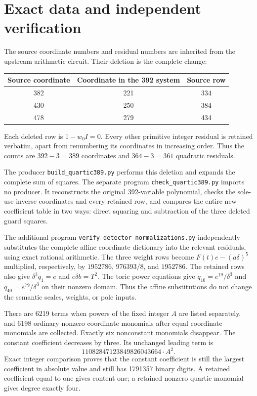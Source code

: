 \documentclass[11pt,a4paper]{article}
\theoremstyle{remark}\newtheorem{remark}[theorem]{Remark}
\begin{document}
\section{Exact data and independent verification}
The source coordinate numbers and residual numbers are inherited from
the upstream arithmetic circuit. Their deletion is the complete change:
\begin{center}
\begin{tabular}{ccc}
\toprule Source coordinate & Coordinate in the 392 system & Source row\\
\midrule382&221&334\\430&250&384\\478&279&434\\\bottomrule
\end{tabular}
\end{center}
Each deleted row is $1-w_0I=0$. Every other primitive integer residual
is retained verbatim, apart from renumbering its coordinates in increasing
order. Thus the counts are $392-3=389$ coordinates and $364-3=361$
quadratic residuals.

The producer \nolinkurl{build_quartic389.py} performs this deletion
and expands the complete sum of squares. The separate program
\nolinkurl{check_quartic389.py} imports no producer. It reconstructs
the original 392-variable polynomial, checks the sole-use inverse
coordinates and every retained row, and compares the entire new
coefficient table in two ways: direct squaring and subtraction of
the three deleted guard squares.

The additional program \nolinkurl{verify_detector_normalizations.py}
independently substitutes the complete affine coordinate dictionary
into the relevant residuals, using exact rational arithmetic. The
three weight rows become $F(t)e-(a\delta)^5$ multiplied, respectively,
by $1952786$, $976393/8$, and $1952786$. The retained rows also give
$\delta^3q_1=e$ and $e\delta b=T^2$. The toric power equations give
$q_{10}=e^{19}/\delta^3$ and $q_{40}=e^{79}/\delta^3$ on their
nonzero domain. Thus the affine substitutions do not change the
semantic scales, weights, or pole inputs.

There are 6219 terms when powers of the fixed integer $A$ are listed
separately, and 6198 ordinary nonzero coordinate monomials after equal
coordinate monomials are collected. Exactly six nonconstant monomials
disappear. The constant coefficient decreases by three. Its unchanged
leading term is
\[
                    11082847123849826043664\cdot A^2.
\]
Exact integer comparison proves that the constant coefficient is
still the largest coefficient in absolute value and still has 1791357
binary digits. A retained coefficient equal to one gives content one;
a retained nonzero quartic monomial gives degree exactly four.
\end{document}
